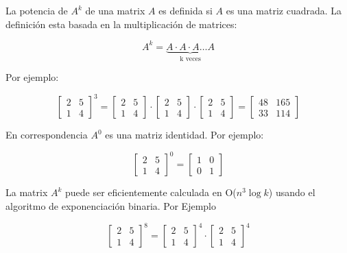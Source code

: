 La potencia de $A^k$ de una matrix $A$ es definida si $A$ es una matriz cuadrada. La definición esta basada en la multiplicación de matrices:

$$
A^k = \underset{\text{k veces}}{\underbrace{A \cdot A \cdot A \dots A}}
$$

Por ejemplo:

$$
\begin{bmatrix}
	2 & 5  \\
	1 & 4 
\end{bmatrix}^3  =
\begin{bmatrix}
	2 & 5  \\
	1 & 4 
\end{bmatrix} \cdot
\begin{bmatrix}
	2 & 5  \\
	1 & 4 
\end{bmatrix} \cdot
\begin{bmatrix}
	2 & 5  \\
	1 & 4 
\end{bmatrix}
=
\begin{bmatrix}
	48 & 165  \\
	33 & 114
\end{bmatrix}$$ 

En correspondencia $A^0$ es una matriz identidad. Por ejemplo:

$$\begin{bmatrix}
	2 & 5  \\
	1 & 4 
\end{bmatrix}^0  =
\begin{bmatrix}
	1 & 0  \\
	0 & 1 
\end{bmatrix}$$



La matrix $A^k$ puede ser eficientemente calculada en O($n^3\log k$) usando el algoritmo de exponenciación binaria. Por Ejemplo

$$\begin{bmatrix}
	2 & 5  \\
	1 & 4 
\end{bmatrix}^8  =
\begin{bmatrix}
	2 & 5  \\
	1 & 4
\end{bmatrix}^4 \cdot
\begin{bmatrix}
	2 & 5  \\
	1 & 4
\end{bmatrix}^4$$


